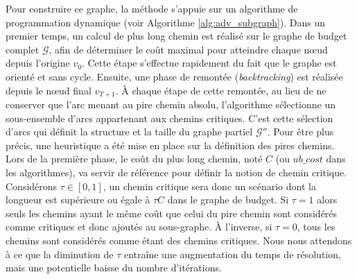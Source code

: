 \documentclass[12pt, a4paper, twoside]{article}
\numberwithin{equation}{section}
\begin{document}
	Pour construire ce graphe, la méthode s'appuie sur un algorithme de programmation dynamique (voir Algorithme \ref{alg:adv_subgraph}). Dans un premier temps, un calcul de plus long chemin est réalisé sur le graphe de budget complet $\mathcal{G}$, afin de déterminer le coût maximal pour atteindre chaque nœud depuis l'origine $v_0$. Cette étape s'effectue rapidement du fait que le graphe est orienté et sans cycle. Ensuite, une phase de remontée (\textit{backtracking}) est réalisée depuis le nœud final $v_{T+1}$. À chaque étape de cette remontée, au lieu de ne conserver que l'arc menant au pire chemin absolu, l'algorithme sélectionne un sous-ensemble d'arcs appartenant aux chemins critiques. C'est cette sélection d'arcs qui définit la structure et la taille du graphe partiel $\mathcal{G}''$. Pour être plus précis, une heuristique a été mise en place sur la définition des pires chemins. Lors de la première phase, le coût du plus long chemin, noté $C$ (ou $ub\_cost$ dans les algorithmes), va servir de référence pour définir la notion de chemin critique. Considérons $\tau\in[0, 1]$, un chemin critique sera donc un scénario dont la longueur est supérieure ou égale à $\tau C$ dans le graphe de budget. Si $\tau=1$ alors seuls les chemins ayant le même coût que celui du pire chemin sont considérés comme critiques et donc ajoutés au sous-graphe. À l'inverse, si $\tau=0$, tous les chemins sont considérés comme étant des chemins critiques. Nous nous attendons à ce que la diminution de $\tau$ entraîne une augmentation du temps de résolution, mais une potentielle baisse du nombre d'itérations.
\end{document}
